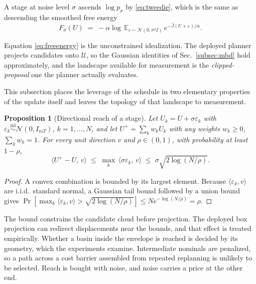 \documentclass[letterpaper,10pt,conference]{ieeeconf}
\newtheorem{proposition}{Proposition}
\begin{document}
A stage at noise level $\sigma$ ascends $\log p_\sigma$ by \eqref{eq:tweedie}, which is the same as descending the smoothed free energy
\begin{equation}
F_\sigma(U) \;=\; -\alpha \log\, \mathbb{E}_{\varepsilon \sim \mathcal{N}(0, \sigma^{2} I)}\,
e^{-\hat J(U + \varepsilon)/\alpha} .
\label{eq:freeenergy}
\end{equation}

Equation \eqref{eq:freeenergy} is the unconstrained idealization.
The deployed planner projects candidates onto $\mathcal{U}$, so the Gaussian identities of Sec.~\ref{subsec:mbd} hold approximately, and the landscape available for measurement is the \emph{clipped-proposal} one the planner actually evaluates.

This subsection places the leverage of the schedule in two elementary properties of the update itself and leaves the topology of that landscape to measurement.

\begin{proposition}[Directional reach of a stage]\label{prop:reach}
Let $U_k = U + \sigma \varepsilon_k$ with $\varepsilon_k \overset{\mathrm{iid}}{\sim} \mathcal{N}(0, I_{mT})$, $k = 1, \dots, N$, and let $U^{+} = \sum_k w_k U_k$ with any weights $w_k \ge 0$, $\sum_k w_k = 1$.
For every unit direction $v$ and $\rho \in (0, 1)$, with probability at least $1 - \rho$,
\begin{equation}
\big\langle U^{+} - U,\, v \big\rangle
\;\le\; \max_k\, \big\langle \sigma \varepsilon_k,\, v \big\rangle
\;\le\; \sigma \sqrt{2 \log (N/\rho)} .
\label{eq:reach}
\end{equation}
\end{proposition}
\begin{proof}
A convex combination is bounded by its largest element. Because $\langle \varepsilon_k,v\rangle$ are i.i.d.\ standard normal, a Gaussian tail bound followed by a union bound gives $\Pr[\max_k \langle \varepsilon_k,v\rangle > \sqrt{2\log(N/\rho)}] \le N e^{-\log(N/\rho)}=\rho$.
\end{proof}

The bound constrains the candidate cloud before projection.
The deployed box projection can redirect displacements near the bounds, and that effect is treated empirically.
Whether a basin inside the envelope is reached is decided by its geometry, which the experiments examine.
Intermediate nominals are penalized, so a path across a cost barrier assembled from repeated replanning is unlikely to be selected.
Reach is bought with noise, and noise carries a price at the other end.
\end{document}
